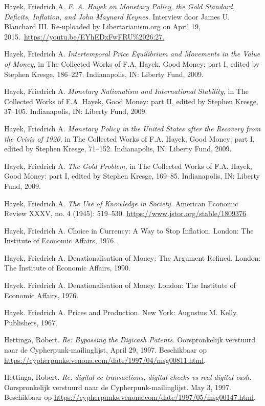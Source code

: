\documentclass[
  a5paper,
  smalldemyvopaper,11pt,twoside,onecolumn,openright,extrafontsizes,
hidelinks]{memoir}
\begin{document}
{Hayek, Friedrich A. \emph{F. A. Hayek on Monetary Policy, the Gold
Standard, Deficits, Inflation, and John Maynard Keynes.} Interview door
James U. Blanchard III. Re-uploaded by Libertarianism.org on April 19,
2015.~\url{https://youtu.be/EYhEDxFwFRU\%2026:27.}

Hayek, Friedrich A. \emph{Intertemporal Price Equilibrium and Movements
in the Value of Money,} in The Collected Works of F.A. Hayek, Good
Money: part I, edited by Stephen Kresge, 186--227. Indianapolis, IN:
Liberty Fund, 2009.

Hayek, Friedrich A. \emph{Monetary Nationalism and International
Stability,} in The Collected Works of F.A. Hayek, Good Money: part II,
edited by Stephen Kresge, 37--105. Indianapolis, IN: Liberty Fund, 2009.

Hayek, Friedrich A. \emph{Monetary Policy in the United States after the
Recovery from the Crisis of 1920,} in The Collected Works of F.A. Hayek,
Good Money: part I, edited by Stephen Kresge, 71--152. Indianapolis, IN:
Liberty Fund, 2009.

Hayek, Friedrich A. \emph{The Gold Problem,} in The Collected Works of
F.A. Hayek, Good Money: part I, edited by Stephen Kresge, 169--85.
Indianapolis, IN: Liberty Fund, 2009.

Hayek, Friedrich A. \emph{The Use of Knowledge in Society.} American
Economic Review XXXV, no. 4 (1945): 519--530.
\url{https://www.jstor.org/stable/1809376}

Hayek, Friedrich A. Choice in Currency: A Way to Stop Inflation. London:
The Institute of Economic Affairs, 1976.

Hayek, Friedrich A. Denationalisation of Money: The Argument Refined.
London: The Institute of Economic Affairs, 1990.

Hayek. Friedrich A. Denationalisation of Money. London: The Institute of
Economic Affairs, 1976.

Hayek. Friedrich A. Prices and Production. New York: Augustus M. Kelly,
Publishers, 1967.

Hettinga, Robert. \emph{Re: Bypassing the Digicash Patents.}
Oorspronkelijk verstuurd naar de Cypherpunk-mailinglijst, April 29,
1997. Beschikbaar op
\url{https://cypherpunks.venona.com/date/1997/04/msg00811.html}.

Hettinga, Robert. \emph{Re: digital cc transactions, digital checks vs
real digital cash.} Oorspronkelijk verstuurd naar de
Cypherpunk-mailinglijst. May 3, 1997. Beschikbaar op
\url{https://cypherpunks.venona.com/date/1997/05/msg00147.html}.

}
\end{document}
